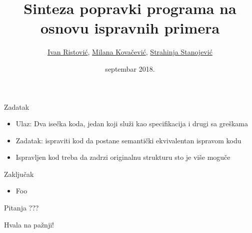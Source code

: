 \documentclass{beamer}
\title{Sinteza popravki programa na osnovu ispravnih primera}
\author{\href{mailto:mi14031@matf.bg.ac.rs}{Ivan Ristović}, \href{mailto:mi14042@matf.bg.ac.rs}{Milana Kovačević}, \href{mailto:mi14207@matf.bg.ac.rs}{Strahinja Stanojević}
}
\date{septembar 2018.}
\begin{document}
\begin{frame}
    \titlepage
\end{frame}

\begin{frame}{Zadatak}
    \begin{itemize}
        \item Ulaz: Dva ise\v{c}ka koda, jedan koji slu\v{z}i kao specifikacija i drugi sa gre\v{s}kama
        \item Zadatak: ispraviti kod da postane semanti\v{c}ki ekvivalentan ispravom kodu
        \item Ispravljen kod treba da zadrzi originalnu strukturu sto je vi\v{s}e mogu\v{c}e
    \end{itemize}
\end{frame}



%
%
%


\begin{frame}{Zaklju\v{c}ak}
    \centering
    \begin{itemize}
        \item Foo
    \end{itemize}
\end{frame}

\begin{frame}{Pitanja}
    \centering
    ???
\end{frame}

\begin{frame}{}
    \centering
    Hvala na pa\v{z}nji!
\end{frame}
\end{document}
